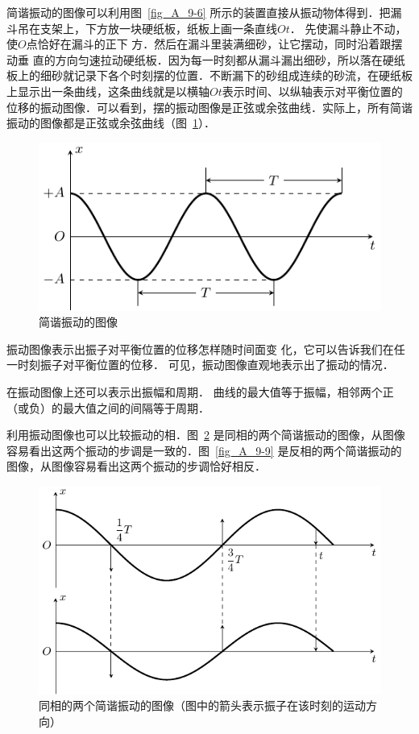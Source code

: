简谐振动的图像可以利用图~\ref{fig_A_9-6} 所示的装置直接从振动物体得到．把漏斗吊在支架上，下方放一块硬纸板，纸板上画一条直线$Ot$．
先使漏斗静止不动，使$O$点恰好在漏斗的正下
方．然后在漏斗里装满细砂，让它摆动，同时沿着跟摆动垂
直的方向匀速拉动硬纸板．因为每一时刻都从漏斗漏出细砂，所以落在硬纸板上的细砂就记录下各个时刻摆的位置．不断漏下的砂组成连续的砂流，在硬纸板上显示出一条曲线，这条曲线就是以横轴$Ot$表示时间、以纵轴表示对平衡位置的位移的振动图像．可以看到，摆的振动图像是正弦或余弦曲线．实际上，所有简谐振动的图像都是正弦或余弦曲线（图~\ref{fig_A_9-7}）．
\begin{figure}[htbp]
    \centering
    \includegraphics{fig/A/9-7.pdf}
    \caption{简谐振动的图像}\label{fig_A_9-7}
\end{figure}

振动图像表示出振子对平衡位置的位移怎样随时间面变
化，它可以告诉我们在任一时刻振子对平衡位置的位移．
可见，振动图像直观地表示出了振动的情况．

在振动图像上还可以表示出振幅和周期．
曲线的最大值等于振幅，相邻两个正（或负）的最大值之间的间隔等于周期．

利用振动图像也可以比较振动的相．图~\ref{fig_A_9-8} 是同相的两个简谐振动的图像，从图像容易看出这两个振动的步调是一致的．图~\ref{fig_A_9-9} 是反相的两个简谐振动的图像，从图像容易看出这两个振动的步调恰好相反．

\begin{figure}[htbp]
    \centering
    \includegraphics{fig/A/9-8.pdf}
    \caption{同相的两个简谐振动的图像（图中的箭头表示振子在该时刻的运动方向）}\label{fig_A_9-8}
\end{figure}

